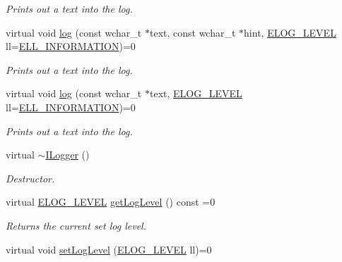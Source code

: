 \begin{DoxyCompactItemize}
\begin{DoxyCompactList}\small\item\em Prints out a text into the log. \end{DoxyCompactList}\item 
virtual void \hyperlink{classirr_1_1ILogger_aeef998619135d81205d2fd488d4a69b1}{log} (const wchar\+\_\+t $\ast$text, const wchar\+\_\+t $\ast$hint, \hyperlink{namespaceirr_aa2d1cac68606a25ed24cfffccfa30a92}{E\+L\+O\+G\+\_\+\+L\+E\+V\+EL} ll=\hyperlink{namespaceirr_aa2d1cac68606a25ed24cfffccfa30a92aaed3e0f449ad8851a1bb501d4df1c0e7}{E\+L\+L\+\_\+\+I\+N\+F\+O\+R\+M\+A\+T\+I\+ON})=0
\begin{DoxyCompactList}\small\item\em Prints out a text into the log. \end{DoxyCompactList}\item 
virtual void \hyperlink{classirr_1_1ILogger_a40af57afdc28c5e890920cb448663ff9}{log} (const wchar\+\_\+t $\ast$text, \hyperlink{namespaceirr_aa2d1cac68606a25ed24cfffccfa30a92}{E\+L\+O\+G\+\_\+\+L\+E\+V\+EL} ll=\hyperlink{namespaceirr_aa2d1cac68606a25ed24cfffccfa30a92aaed3e0f449ad8851a1bb501d4df1c0e7}{E\+L\+L\+\_\+\+I\+N\+F\+O\+R\+M\+A\+T\+I\+ON})=0
\begin{DoxyCompactList}\small\item\em Prints out a text into the log. \end{DoxyCompactList}\item 
\mbox{\label{classirr_1_1ILogger_ae1ceda88c9b97cc1efcefa38588f9116}} 
virtual \hyperlink{classirr_1_1ILogger_ae1ceda88c9b97cc1efcefa38588f9116}{$\sim$\+I\+Logger} ()
\begin{DoxyCompactList}\small\item\em Destructor. \end{DoxyCompactList}\item 
\mbox{\label{classirr_1_1ILogger_af32c91dd813853eb0d72c10b5d774b93}} 
virtual \hyperlink{namespaceirr_aa2d1cac68606a25ed24cfffccfa30a92}{E\+L\+O\+G\+\_\+\+L\+E\+V\+EL} \hyperlink{classirr_1_1ILogger_af32c91dd813853eb0d72c10b5d774b93}{get\+Log\+Level} () const =0
\begin{DoxyCompactList}\small\item\em Returns the current set log level. \end{DoxyCompactList}\item 
virtual void \hyperlink{classirr_1_1ILogger_a226a6f71f76970f2d846a10599f2e5ec}{set\+Log\+Level} (\hyperlink{namespaceirr_aa2d1cac68606a25ed24cfffccfa30a92}{E\+L\+O\+G\+\_\+\+L\+E\+V\+EL} ll)=0

\end{DoxyCompactItemize}

